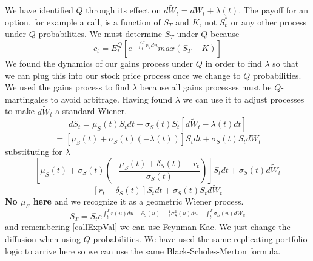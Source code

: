 We have identified $Q$ through its effect on $d\tilde{W}_t=dW_t+\lambda(t)$.
The payoff for an option, for example a call, is a function of $S_T$ and $K$,
not $S_t^*$ or any other process under $Q$ probabilities. We must determine
$S_T$ under $Q$ because
\begin{equation} \label{callExpVal}
  c_t=E_t^Q\left[ e^{-\int_t^Tr_udu}max(S_T-K) \right]
\end{equation}
We found the dynamics of our gains process under $Q$ in order to find $\lambda$
so that we can plug this into our stock price process once we change to $Q$
probabilities. We used the gains process to find $\lambda$ because all gains
processes must be $Q$-martingales to avoid arbitrage. Having found $\lambda$ we
can use it to adjust processes to make $d\tilde{W}_t$ a standard Wiener.
\[dS_t=\mu_S(t)S_tdt+\sigma_S(t)S_t[d\tilde{W}_t-\lambda(t)dt]\]
\[=[\mu_S(t)+\sigma_S(t)(-\lambda(t))]S_tdt+\sigma_S(t)S_td\tilde{W}_t\]
substituting for $\lambda$
\[
  \left[\mu_S(t)+\sigma_S(t)
  \left( -\frac{\mu_S(t)+\delta_S(t)-r_t}{\sigma_S(t)}\right)\right]
  S_tdt+\sigma_S(t)d\tilde{W}_t
\]
\[[r_t-\delta_S(t)]S_tdt+\sigma_S(t)S_td\tilde{W}_t\]
\textbf{No $\mu_S$ here} and we recognize it as a geometric Wiener process.
\[
  S_T=S_te^{\int_t^Tr(u)du-\delta_S(u)-\frac{1}{2}\sigma_S^2(u)du+
  \int_t^T\sigma_S(u)d\tilde{W}_u}
\]
and remembering \ref{callExpVal} we can use Feynman-Kac. We just change the
diffusion when using $Q$-probabilities. We have used the same replicating
portfolio logic to arrive here so we can use the same Black-Scholes-Merton
formula.
